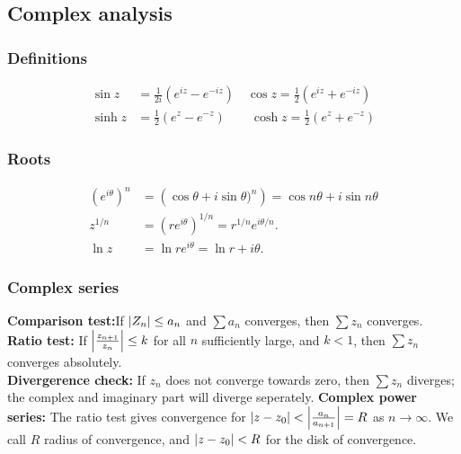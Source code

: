 \documentclass[a4paper, 10pt]{article}
\begin{document}
\tiny
\begin{multicols*}{3}
\begin{mdframed}
\subsection*{Complex analysis}
\end{mdframed}
\subsubsection*{Definitions}
\begin{align*}
  \sin{z} &= \frac{1}{2i}\left(e^{iz}-e^{-iz}\right)\quad
  \cos{z} = \frac{1}{2}\left(e^{iz}+e^{-iz}\right)\\
  \sinh{z} &= \frac{1}{2}\left(e^{z}-e^{-z}\right)\qquad
  \cosh{z} = \frac{1}{2}\left(e^{z}+e^{-z}\right)
\end{align*}

\subsubsection*{Roots}
\begin{align*}
  \left(e^{i\theta}\right)^n &= \left(\cos{\theta} + i \sin{\theta})^n\right) = \cos{n\theta} + i\sin{n\theta}\\
  z^{1/n} &= \left(re^{i\theta}\right)^{1/n} = r^{1/n}e^{i\theta/n}.\\
  \ln{z} &= \ln{re^{i\theta}} = \ln{r} + i\theta.
\end{align*}


\subsubsection*{Complex series}
\textbf{Comparison test:}If $\abs{Z_n} \leq a_n$ and $\sum a_n$ converges, then $\sum z_n$ converges.\\
\textbf{Ratio test:} If $\abs{\frac{z_{n+1}}{z_n}} \leq k$ for all $n$ sufficiently large, and $k<1$, then $\sum z_n$ converges absolutely.\\
\textbf{Divergerence check:} If $z_n$ does not converge towards zero, then $\sum z_n$ diverges; the complex and imaginary part will diverge seperately.
\textbf{Complex power series:} The ratio test gives convergence for $\abs{z-z_0} < \abs{\frac{a_n}{a_{n+1}}} = R$ as $n\rightarrow \infty$. We call $R$ radius of convergence, and $\abs{z-z_0} < R$ for the disk of convergence.


\end{multicols*}
\end{document}
